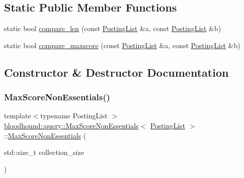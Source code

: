 \subsection*{Static Public Member Functions}
\begin{DoxyCompactItemize}
\item 
static bool \mbox{\hyperlink{classbloodhound_1_1query_1_1MaxScoreNonEssentials_a2ea9f46aa9175fe20243e7cb2886f1f0}{compare\+\_\+len}} (const \mbox{\hyperlink{classbloodhound_1_1PostingList}{Posting\+List}} \&a, const \mbox{\hyperlink{classbloodhound_1_1PostingList}{Posting\+List}} \&b)
\item 
static bool \mbox{\hyperlink{classbloodhound_1_1query_1_1MaxScoreNonEssentials_a758b1b31a3ec9b563978ed7a11e3987c}{compare\+\_\+maxscore}} (const \mbox{\hyperlink{classbloodhound_1_1PostingList}{Posting\+List}} \&a, const \mbox{\hyperlink{classbloodhound_1_1PostingList}{Posting\+List}} \&b)
\end{DoxyCompactItemize}


\subsection{Constructor \& Destructor Documentation}
\mbox{\label{classbloodhound_1_1query_1_1MaxScoreNonEssentials_a4ca74b906a87120ffcad3bc6edcc148c}} 
\subsubsection{\texorpdfstring{Max\+Score\+Non\+Essentials()}{MaxScoreNonEssentials()}}
{\footnotesize\ttfamily template$<$typename Posting\+List $>$ \\
\mbox{\hyperlink{classbloodhound_1_1query_1_1MaxScoreNonEssentials}{bloodhound\+::query\+::\+Max\+Score\+Non\+Essentials}}$<$ \mbox{\hyperlink{classbloodhound_1_1PostingList}{Posting\+List}} $>$\+::\mbox{\hyperlink{classbloodhound_1_1query_1_1MaxScoreNonEssentials}{Max\+Score\+Non\+Essentials}} (\begin{DoxyParamCaption}\item[{std\+::size\+\_\+t}]{collection\+\_\+size }\end{DoxyParamCaption})\hspace{0.3cm}{\ttfamily [inline]}}



